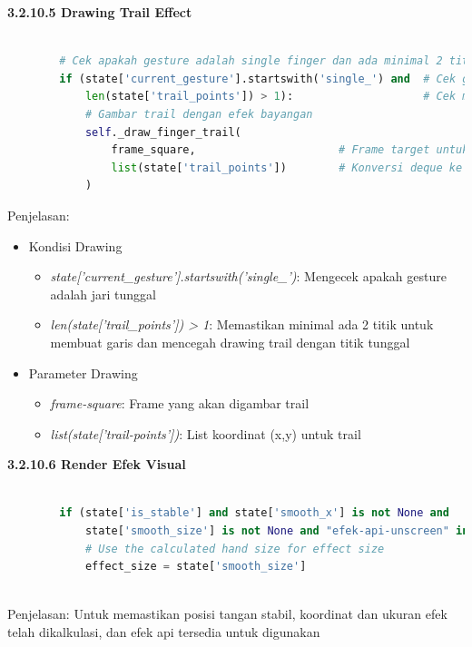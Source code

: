\documentclass[11pt,a4paper]{article}
\begin{document}
    \noindent\textbf{3.2.10.5 Drawing Trail Effect}
    \begin{lstlisting}[language=Python, caption=Drawing Trail Effect]
    
        # Cek apakah gesture adalah single finger dan ada minimal 2 titik trail
        if (state['current_gesture'].startswith('single_') and  # Cek gesture single finger
            len(state['trail_points']) > 1):                    # Cek minimal 2 titik untuk trail
            # Gambar trail dengan efek bayangan
            self._draw_finger_trail(
                frame_square,                      # Frame target untuk drawing
                list(state['trail_points'])        # Konversi deque ke list titik-titik trail
            )
    \end{lstlisting}
    Penjelasan:
    \begin{itemize}
        \item Kondisi Drawing
        \begin{itemize}
            \item \textit{state['current_gesture'].startswith('single_')}: Mengecek apakah gesture adalah jari tunggal
            \item \textit{len(state['trail_points']) > 1}: Memastikan minimal ada 2 titik untuk membuat garis dan mencegah drawing trail dengan titik tunggal
        \end{itemize}
        \item Parameter Drawing
        \begin{itemize}
            \item \textit{frame-square}: Frame yang akan digambar trail
            \item \textit{list(state['trail-points'])}: List koordinat (x,y) untuk trail
        \end{itemize}
    \end{itemize}
    \noindent\textbf{3.2.10.6 Render Efek Visual}
    \begin{lstlisting}[language=Python, caption=Kondisi Rendering]
    
        if (state['is_stable'] and state['smooth_x'] is not None and 
            state['smooth_size'] is not None and "efek-api-unscreen" in self.effects):
            # Use the calculated hand size for effect size
            effect_size = state['smooth_size']
                    
    \end{lstlisting}
    Penjelasan: Untuk memastikan posisi tangan stabil, koordinat dan ukuran efek telah dikalkulasi, dan efek api tersedia untuk digunakan
\end{document}
